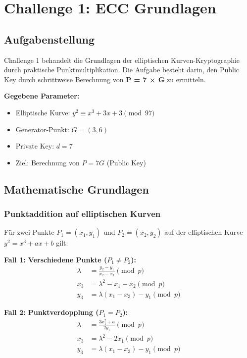 \documentclass{article}
\begin{document}
\section{Challenge 1: ECC Grundlagen}

\subsection{Aufgabenstellung}
Challenge 1 behandelt die Grundlagen der elliptischen Kurven-Kryptographie durch praktische Punktmultiplikation. Die Aufgabe besteht darin, den Public Key durch schrittweise Berechnung von \textbf{P = 7 × G} zu ermitteln.

\noindent
\textbf{Gegebene Parameter:}
\begin{itemize}
    \item Elliptische Kurve: $y^2 \equiv x^3 + 3x + 3 \pmod{97}$
    \item Generator-Punkt: $G = (3, 6)$
    \item Private Key: $d = 7$
    \item Ziel: Berechnung von $P = 7G$ (Public Key)
\end{itemize}

\subsection{Mathematische Grundlagen}

\subsubsection{Punktaddition auf elliptischen Kurven}
Für zwei Punkte $P_1 = (x_1, y_1)$ und $P_2 = (x_2, y_2)$ auf der elliptischen Kurve $y^2 = x^3 + ax + b$ gilt:

\noindent
\textbf{Fall 1: Verschiedene Punkte ($P_1 \neq P_2$):}
\begin{align}
\lambda &= \frac{y_2 - y_1}{x_2 - x_1} \pmod{p} \\
x_3 &= \lambda^2 - x_1 - x_2 \pmod{p} \\
y_3 &= \lambda(x_1 - x_3) - y_1 \pmod{p}
\end{align}

\noindent
\textbf{Fall 2: Punktverdopplung ($P_1 = P_2$):}
\begin{align}
\lambda &= \frac{3x_1^2 + a}{2y_1} \pmod{p} \\
x_3 &= \lambda^2 - 2x_1 \pmod{p} \\
y_3 &= \lambda(x_1 - x_3) - y_1 \pmod{p}
\end{align}
\end{document}
